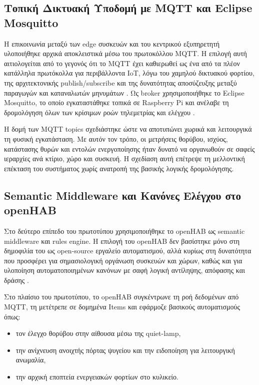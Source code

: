 \subsection{Τοπική Δικτυακή Υποδομή με MQTT και Eclipse Mosquitto}
Η επικοινωνία μεταξύ των \textlatin{edge} συσκευών και του κεντρικού εξυπηρετητή υλοποιήθηκε αρχικά αποκλειστικά μέσω του πρωτοκόλλου \textlatin{MQTT}. Η επιλογή αυτή αιτιολογείται από το γεγονός ότι το \textlatin{MQTT} έχει καθιερωθεί ως ένα από τα πλέον κατάλληλα πρωτόκολλα για περιβάλλοντα \textlatin{IoT}, λόγω του χαμηλού δικτυακού φορτίου, της αρχιτεκτονικής \textlatin{publish/subscribe} και της δυνατότητας αποσύζευξης μεταξύ παραγωγών και καταναλωτών μηνυμάτων \cite{Mosquitto_docs}. Ως \textlatin{broker} χρησιμοποιήθηκε το \textlatin{Eclipse Mosquitto}, το οποίο εγκαταστάθηκε τοπικά σε \textlatin{Raspberry Pi} και ανέλαβε τη δρομολόγηση όλων των κρίσιμων ροών τηλεμετρίας και ελέγχου \cite{Mosquitto_docs}.

Η δομή των \textlatin{MQTT topics} σχεδιάστηκε ώστε να αποτυπώνει χωρικά και λειτουργικά τη φυσική εγκατάσταση. Με αυτόν τον τρόπο, οι μετρήσεις θορύβου, ισχύος, κατάστασης θυρών και εντολών ενεργοποίησης ήταν δυνατό να οργανωθούν σε σαφείς ιεραρχίες ανά κτίριο, χώρο και συσκευή. Η σχεδίαση αυτή επέτρεψε τη μελλοντική επέκταση του συστήματος χωρίς ανατροπή της βασικής λογικής δρομολόγησης.

\subsection{Semantic Middleware και Κανόνες Ελέγχου στο openHAB}
Στο δεύτερο επίπεδο του πρωτοτύπου χρησιμοποιήθηκε το \textlatin{openHAB} ως \textlatin{semantic middleware} και \textlatin{rules engine}. Η επιλογή του \textlatin{openHAB} δεν βασίστηκε μόνο στη δημοφιλία του ως \textlatin{open-source} εργαλείο αυτοματισμού, αλλά κυρίως στη δυνατότητα που προσφέρει για σημασιολογική οργάνωση συσκευών και χώρων, καθώς και για υλοποίηση αυτοματοποιημένων κανόνων με σαφή λογική αντίληψης, απόφασης και δράσης \cite{openHAB_docs}.

Στο πλαίσιο του πρωτοτύπου, το \textlatin{openHAB} συγκέντρωνε τη ροή δεδομένων από \textlatin{MQTT}, τη μετέτρεπε σε δομημένα \textlatin{Items} και εφάρμοζε βασικούς αυτοματισμούς όπως:
\begin{itemize}
  \item τον έλεγχο θορύβου στην αίθουσα μέσω της \textlatin{quiet-lamp},
  \item την ανίχνευση ανοιχτής πόρτας ψυγείου και την ειδοποίηση για λειτουργική ανωμαλία,
  \item την αρχική εποπτεία ενεργειακών φορτίων στο κυλικείο.
\end{itemize}

